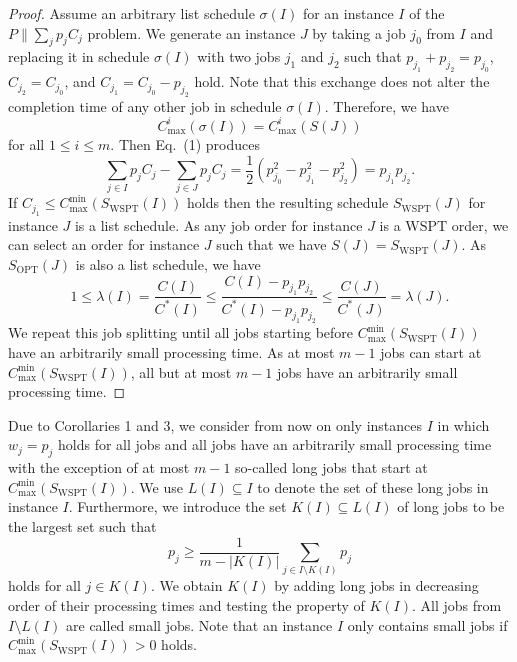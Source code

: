 \documentclass[11pt]{article}
\newcommand{\WSPT}{\mathrm{WSPT}}
\newcommand{\OPT}{\mathrm{OPT}}
\newcommand{\Cmin}{C_{\max}^{\min}}
\begin{document}
\begin{proof}
Assume an arbitrary list schedule $\sigma(I)$ for an instance $I$ of the
$P\|\sum_j p_j C_j$ problem. We generate an instance $J$ by taking a job
$j_0$ from $I$ and replacing it in schedule $\sigma(I)$ with two jobs $j_1$ and
$j_2$ such that $p_{j_1}+p_{j_2}=p_{j_0}$, $C_{j_2}=C_{j_0}$, and
$C_{j_1}=C_{j_0}-p_{j_2}$ hold. Note that this exchange does not alter the
completion time of any other job in schedule $\sigma(I)$. Therefore, we have
\[
        C_{\max}^i(\sigma(I))=C_{\max}^i(S(J))
\]
for all $1\leq i\leq m$. Then Eq.~(1) produces
\[
        \sum_{j\in I}p_j C_j-\sum_{j\in J}p_j C_j
        =
        \frac12(p_{j_0}^2-p_{j_1}^2-p_{j_2}^2)
        =
        p_{j_1}p_{j_2}.
\]
If $C_{j_1}\leq \Cmin(S_{\WSPT}(I))$ holds then the resulting schedule
$S_{\WSPT}(J)$ for instance $J$ is a list schedule. As any job order for
instance $J$ is a \(\mathrm{WSPT}\) order, we can select an order for instance $J$ such
that we have $S(J)=S_{\WSPT}(J)$. As $S_{\OPT}(J)$ is also a list schedule, we
have
\[
        1\leq \lambda(I)
        =
        \frac{C(I)}{C^*(I)}
        \leq
        \frac{C(I)-p_{j_1}p_{j_2}}{C^*(I)-p_{j_1}p_{j_2}}
        \leq
        \frac{C(J)}{C^*(J)}
        =
        \lambda(J).
\]
We repeat this job splitting until all jobs starting before
$\Cmin(S_{\WSPT}(I))$ have an arbitrarily small processing time. As at most
$m-1$ jobs can start at $\Cmin(S_{\WSPT}(I))$, all but at most $m-1$ jobs have
an arbitrarily small processing time.
\end{proof}

Due to Corollaries 1 and 3, we consider from now on only instances $I$ in
which $w_j=p_j$ holds for all jobs and all jobs have an arbitrarily small
processing time with the exception of at most $m-1$ so-called long jobs that
start at $\Cmin(S_{\WSPT}(I))$. We use $L(I)\subseteq I$ to denote the set of
these long jobs in instance $I$. Furthermore, we introduce the set
$K(I)\subseteq L(I)$ of long jobs to be the largest set such that
\[
        p_j\geq \frac1{m-|K(I)|}\sum_{j\in I\setminus K(I)}p_j
\]
holds for all $j\in K(I)$. We obtain $K(I)$ by adding long jobs in decreasing
order of their processing times and testing the property of $K(I)$. All jobs
from $I\setminus L(I)$ are called small jobs. Note that an instance $I$ only
contains small jobs if $\Cmin(S_{\WSPT}(I))>0$ holds.
\end{document}
